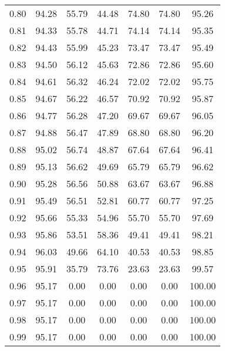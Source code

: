 \begin{tabular}{|c|c|c|c|c|c|c|}
      0.80 &     94.28 &     55.79 &      44.48 &   74.80 &      74.80 &         95.26 \\
      0.81 &     94.33 &     55.78 &      44.71 &   74.14 &      74.14 &         95.35 \\
      0.82 &     94.43 &     55.99 &      45.23 &   73.47 &      73.47 &         95.49 \\
      0.83 &     94.50 &     56.12 &      45.63 &   72.86 &      72.86 &         95.60 \\
      0.84 &     94.61 &     56.32 &      46.24 &   72.02 &      72.02 &         95.75 \\
      0.85 &     94.67 &     56.22 &      46.57 &   70.92 &      70.92 &         95.87 \\
      0.86 &     94.77 &     56.28 &      47.20 &   69.67 &      69.67 &         96.05 \\
      0.87 &     94.88 &     56.47 &      47.89 &   68.80 &      68.80 &         96.20 \\
      0.88 &     95.02 &     56.74 &      48.87 &   67.64 &      67.64 &         96.41 \\
      0.89 &     95.13 &     56.62 &      49.69 &   65.79 &      65.79 &         96.62 \\
      0.90 &     95.28 &     56.56 &      50.88 &   63.67 &      63.67 &         96.88 \\
      0.91 &     95.49 &     56.51 &      52.81 &   60.77 &      60.77 &         97.25 \\
      0.92 &     95.66 &     55.33 &      54.96 &   55.70 &      55.70 &         97.69 \\
      0.93 &     95.86 &     53.51 &      58.36 &   49.41 &      49.41 &         98.21 \\
      0.94 &     96.03 &     49.66 &      64.10 &   40.53 &      40.53 &         98.85 \\
      0.95 &     95.91 &     35.79 &      73.76 &   23.63 &      23.63 &         99.57 \\
      0.96 &     95.17 &      0.00 &       0.00 &    0.00 &       0.00 &        100.00 \\
      0.97 &     95.17 &      0.00 &       0.00 &    0.00 &       0.00 &        100.00 \\
      0.98 &     95.17 &      0.00 &       0.00 &    0.00 &       0.00 &        100.00 \\
      0.99 &     95.17 &      0.00 &       0.00 &    0.00 &       0.00 &        100.00 \\
\bottomrule
\end{tabular}
